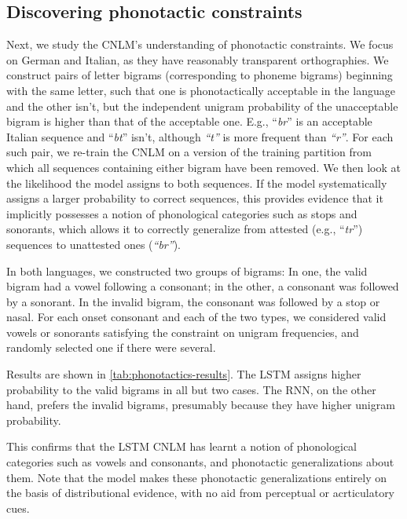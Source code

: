 \subsection{Discovering phonotactic constraints}
\label{sec:phonotactics}

Next, we study the CNLM's understanding of phonotactic constraints.
We focus on German and Italian, as they have reasonably transparent orthographies.
We construct pairs of letter bigrams (corresponding to phoneme
bigrams) beginning with the same letter, such that one is
phonotactically acceptable in the language and the other isn't, but
the independent unigram probability of the unacceptable bigram is
higher than that of the acceptable one. E.g., ``\emph{br}'' is
an acceptable Italian sequence and ``\emph{bt}'' isn't, although
\emph{``t''} is more frequent than \emph{``r''}.
For each such pair, we re-train the CNLM on a version of
the training partition from which all sequences containing either bigram have been removed.
We then look at
the likelihood the model assigns to both sequences. If the model systematically
assigns a larger probability to correct sequences, this provides evidence that it
implicitly possesses a notion of phonological categories such as
stops and sonorants, which allows it to correctly generalize from
attested (e.g., ``\emph{tr}'') sequences to unattested ones
(\emph{``br''}).


In both languages, we constructed two groups of bigrams:
In one, the valid bigram had a vowel following a consonant; in the other, a consonant was followed by a sonorant.
In the invalid bigram, the consonant was followed by a stop or nasal.
For each onset consonant and each of the two types, we considered valid vowels or sonorants satisfying the constraint on unigram frequencies, and randomly selected one if there were several.

Results are shown in \ref{tab:phonotactics-results}.
The LSTM assigns higher probability to the valid bigrams in all but two cases.
The RNN, on the other hand, prefers the invalid bigrams, presumably because they have higher unigram probability.

This confirms that the LSTM CNLM has learnt a notion of phonological categories such as vowels and consonants, and phonotactic generalizations about them.
Note that the model makes these phonotactic generalizations entirely on the basis of distributional evidence, with no aid from perceptual or acrticulatory cues.



